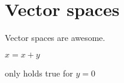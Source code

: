 
\section{Vector spaces}
\begin{definition}
  Vector spaces are awesome. 
\end{definition}

\begin{intuition}
  \( x = x + y\)
\end{intuition}
only holds true for \( y = 0 \)
 

